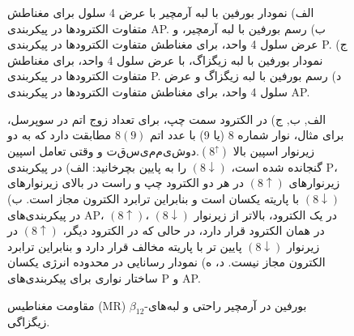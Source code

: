 \begin{figure}[!ht]
  \begin{latin}
  \centering
  \resizebox{0.45\textwidth}{!}{}
  \resizebox{0.45\textwidth}{!}{}
  \resizebox{0.45\textwidth}{!}{}
  \resizebox{0.45\textwidth}{!}{}  
  \end{latin}
\caption{الف) نمودار ‌بورفین با لبه آرمچیر با عرض 4 سلول برای مغناطش متفاوت الکترودها در پیکربندی AP. ب) رسم ‌بورفین با لبه آرمچیر، و عرض سلول 4 واحد، برای مغناطش متفاوت الکترودها در پیکربندی P. ج) نمودار ‌بورفین با لبه زیگزاگ، با عرض سلول 4 واحد، برای مغناطش متفاوت الکترودها در پیکربندی P. د) رسم ‌بورفین با لبه زیگزاگ و عرض سلول 4 واحد، برای مغناطش متفاوت الکترودها در پیکربندی AP.}
\label{fig:conductance}
\end{figure}
\begin{figure}[!ht]
  \begin{latin}
    \centering
    \resizebox{0.32\textwidth}{!}{}
    \resizebox{0.32\textwidth}{!}{}
    \resizebox{0.32\textwidth}{!}{}
    \resizebox{0.45\textwidth}{!}{}
    \resizebox{0.45\textwidth}{!}{}
  \end{latin}
\caption{الف, ب, ج) در الکترود سمت چپ، برای تعداد زوج اتم در سوپرسل، برای مثال، نوار شماره 8 (یا 9) با عدد اتم $8(9)$ مطابقت دارد که به دو زیر‌نوار اسپین بالا $ تقسیم ‌‌می‌‌شود. (8^\uparrow)$ و وقتی تعامل اسپین گنجانده شده است، $(8\downarrow)$ را به پایین بچرخانید: الف) در پیکربندی P، زیر‌نوارهای $(8\uparrow)$ در هر دو الکترود چپ و راست در بالای زیر‌نوارهای $(8\downarrow)$ با پاریته یکسان است و بنابراین ترابرد الکترون مجاز است. ب) در پیکربندی‌های AP، $(8\uparrow)$، در یک الکترود، بالاتر از زیر‌نوار $(8\downarrow)$ در همان الکترود قرار دارد، در حالی که در الکترود دیگر، $(8\uparrow)$ در زیر‌نوار $(8\downarrow)$ پایین تر با پاریته مخالف قرار دارد و بنابراین ترابرد الکترون مجاز نیست. د، ه) نمودار رسانایی در محدوده انرژی یکسان ساختار نواری برای پیکربندی‌های P و AP.}
\label{fig:bandconductance}
\end{figure}

\begin{figure}[!ht]
  \begin{latin}
    \centering
    \resizebox{0.45\textwidth}{!}{}
    \resizebox{0.45\textwidth}{!}{}
  \end{latin}
\caption{مقاومت مغناطیس (MR) $\beta_{12}$-‌بورفین در آرمچیر راحتی و لبه‌های زیگزاگی.}
\label{fig:MR}
\end{figure}

